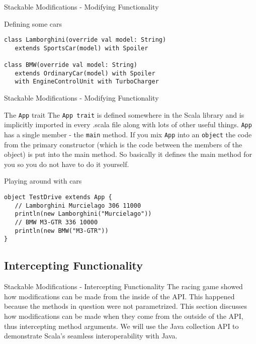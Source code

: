 \begin{frame}[fragile]{Stackable Modifications - Modifying Functionality}
\begin{exampleblock}{Defining some cars}
\begin{lstlisting}
class Lamborghini(override val model: String) 
   extends SportsCar(model) with Spoiler
  
class BMW(override val model: String)
   extends OrdinaryCar(model) with Spoiler
   with EngineControlUnit with TurboCharger
\end{lstlisting}
\end{exampleblock}
\end{frame}

\begin{frame}[fragile]{Stackable Modifications - Modifying Functionality}
\begin{block}{The \lstinline!App! trait}
The \lstinline!App trait! is defined somewhere in the Scala library and is
implicitly imported in every .scala file along with lots of other useful
things. \lstinline!App! has a single member - the \lstinline!main! method.
If you mix \lstinline!App! into an \lstinline!object! the code from the primary
constructor (which is the code between the members of the object) is put into
the main method. So basically it defines the main method for you so you do not
have to do it yourself.
\end{block}
\begin{exampleblock}{Playing around with cars}
\begin{lstlisting}
object TestDrive extends App {
   // Lamborghini Murcielago 306 11000
   println(new Lamborghini("Murcielago"))
   // BMW M3-GTR 336 10000
   println(new BMW("M3-GTR"))
}
\end{lstlisting}
\end{exampleblock}
\end{frame}

\subsection{Intercepting Functionality}
\begin{frame}{Stackable Modifications - Intercepting Functionality}
The racing game showed how modifications can be made from the inside of the API.
This happened because the methods in question were not parametrized. This
section discusses how modifications can be made when they come from the outside
of the API, thus intercepting method arguments. We will use the Java collection
API to demonstrate Scala's seamless interoperability with Java.
\end{frame}


